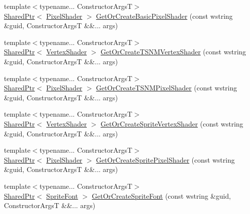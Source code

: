 \begin{DoxyCompactItemize}
\item 
{\footnotesize template$<$typename... Constructor\+ArgsT$>$ }\\\hyperlink{namespacemage_a1e01ae66713838a7a67d30e44c67703e}{Shared\+Ptr}$<$ \hyperlink{classmage_1_1_pixel_shader}{Pixel\+Shader} $>$ \hyperlink{classmage_1_1_resource_manager_a05e5f5b7554ee225e576952206a9bb1e}{Get\+Or\+Create\+Basic\+Pixel\+Shader} (const wstring \&guid, Constructor\+ArgsT \&\&... args)
\item 
{\footnotesize template$<$typename... Constructor\+ArgsT$>$ }\\\hyperlink{namespacemage_a1e01ae66713838a7a67d30e44c67703e}{Shared\+Ptr}$<$ \hyperlink{classmage_1_1_vertex_shader}{Vertex\+Shader} $>$ \hyperlink{classmage_1_1_resource_manager_a67bc7bb6ad9d0f54f6f6387e47365172}{Get\+Or\+Create\+T\+S\+N\+M\+Vertex\+Shader} (const wstring \&guid, Constructor\+ArgsT \&\&... args)
\item 
{\footnotesize template$<$typename... Constructor\+ArgsT$>$ }\\\hyperlink{namespacemage_a1e01ae66713838a7a67d30e44c67703e}{Shared\+Ptr}$<$ \hyperlink{classmage_1_1_pixel_shader}{Pixel\+Shader} $>$ \hyperlink{classmage_1_1_resource_manager_a87b4e80cbe8a2da9f1c3f71c1edd1c31}{Get\+Or\+Create\+T\+S\+N\+M\+Pixel\+Shader} (const wstring \&guid, Constructor\+ArgsT \&\&... args)
\item 
{\footnotesize template$<$typename... Constructor\+ArgsT$>$ }\\\hyperlink{namespacemage_a1e01ae66713838a7a67d30e44c67703e}{Shared\+Ptr}$<$ \hyperlink{classmage_1_1_vertex_shader}{Vertex\+Shader} $>$ \hyperlink{classmage_1_1_resource_manager_ab15125c2b36b887e3b91383fd99d9363}{Get\+Or\+Create\+Sprite\+Vertex\+Shader} (const wstring \&guid, Constructor\+ArgsT \&\&... args)
\item 
{\footnotesize template$<$typename... Constructor\+ArgsT$>$ }\\\hyperlink{namespacemage_a1e01ae66713838a7a67d30e44c67703e}{Shared\+Ptr}$<$ \hyperlink{classmage_1_1_pixel_shader}{Pixel\+Shader} $>$ \hyperlink{classmage_1_1_resource_manager_ad3a2addf1d933fd36f161abb0727bf93}{Get\+Or\+Create\+Sprite\+Pixel\+Shader} (const wstring \&guid, Constructor\+ArgsT \&\&... args)
\item 
{\footnotesize template$<$typename... Constructor\+ArgsT$>$ }\\\hyperlink{namespacemage_a1e01ae66713838a7a67d30e44c67703e}{Shared\+Ptr}$<$ \hyperlink{classmage_1_1_sprite_font}{Sprite\+Font} $>$ \hyperlink{classmage_1_1_resource_manager_a4460beca6c84b100f613936d26551119}{Get\+Or\+Create\+Sprite\+Font} (const wstring \&guid, Constructor\+ArgsT \&\&... args)

\end{DoxyCompactItemize}
